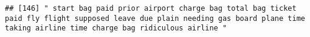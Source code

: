 \documentclass[
]{article}
\begin{document}
\begin{verbatim}
## [146] " start bag paid prior airport charge bag total bag ticket paid fly flight supposed leave due plain needing gas board plane time taking airline time charge bag ridiculous airline "                                                                                                                                                                                                                                                                                                                                                                                                                                                                                                                                                                                                                                                                                                                                                                                                                                                                                                                                                                                                                                                                                                                                                                                                                                                                                                                                                                                                                                                                                                                                                                                                            

\end{verbatim}
\end{document}
